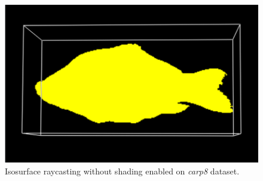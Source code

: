 \documentclass[a4paper]{article}
\begin{document}
\begin{figure}[h]
  \centering
  \includegraphics[width=\textwidth]{iso-surface}
  \caption{Isosurface raycasting without shading enabled on \textit{carp8} dataset.}
  \label{fig:isosurface}
\end{figure}
\end{document}
